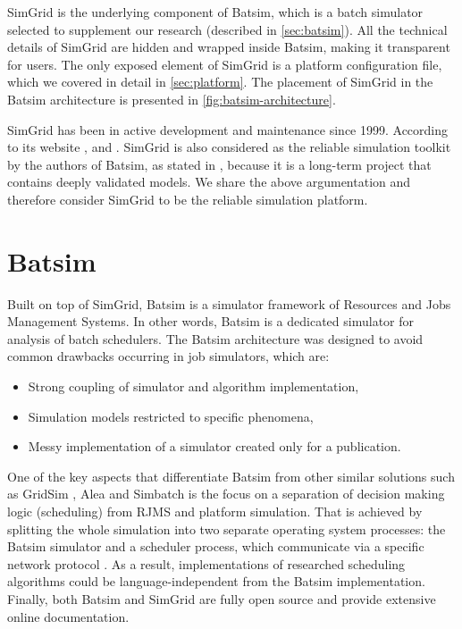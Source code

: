 \documentclass[thesis-en.tex]{subfiles}
\begin{document}
SimGrid is the underlying component of Batsim, which is a batch simulator selected to supplement our research (described in \autoref{sec:batsim}). All the technical details of SimGrid are hidden and wrapped inside Batsim, making it transparent for users. The only exposed element of SimGrid is a platform configuration file, which we covered in detail in \autoref{sec:platform}. The placement of SimGrid in the Batsim architecture is presented in \autoref{fig:batsim-architecture}.

SimGrid has been in active development and maintenance since 1999. According to its website \cite{simgrid} ,  and . SimGrid is also considered as the reliable simulation toolkit by the authors of Batsim, as stated in \cite[Chapter 3.3]{poquet:tel-01757245}, because it is a long-term project that contains deeply validated models. We share the above argumentation and therefore consider SimGrid to be the reliable simulation platform.

\section{Batsim} \label{sec:batsim}
Built on top of SimGrid, Batsim \cite{dutot:hal-01333471, poquet:tel-01757245} is a simulator framework of Resources and Jobs Management Systems. In other words, Batsim is a dedicated simulator for analysis of batch schedulers. The Batsim architecture was designed to avoid common drawbacks occurring in job simulators, which are:
\begin{itemize}
    \item Strong coupling of simulator and algorithm implementation,
    \item Simulation models restricted to specific phenomena,
    \item Messy implementation of a simulator created only for a publication.
\end{itemize}

One of the key aspects that differentiate Batsim from other similar solutions such as GridSim \cite{buyya2002gridsim}, Alea \cite{klusavcek2010alea,klusacek:hal-02329635} and Simbatch \cite{10.1007/978-3-642-00955-6_27} is the focus on a separation of decision making logic (scheduling) from RJMS and platform simulation. That is achieved by splitting the whole simulation into two separate operating system processes: the Batsim simulator and a scheduler process, which communicate via a specific network protocol \cite{batsim-protocol}. As a result, implementations of researched scheduling algorithms could be language-independent from the Batsim implementation. Finally, both Batsim and SimGrid are fully open source and provide extensive online documentation.
\end{document}
